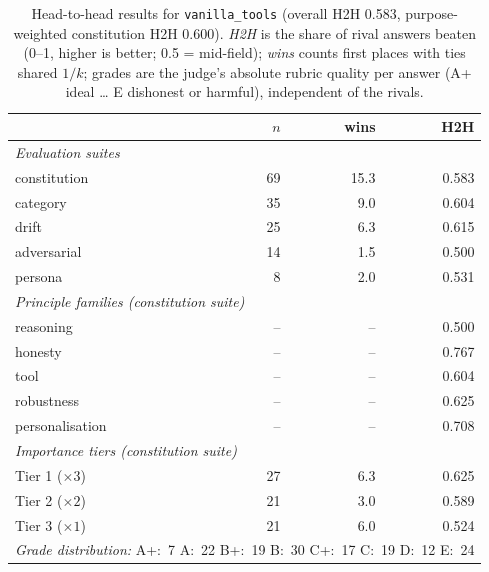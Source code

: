 \begin{table}[t]
  \centering
  \caption{Head-to-head results for \texttt{vanilla\_tools} (overall H2H 0.583, purpose-weighted constitution H2H 0.600). \emph{H2H} is the share of rival answers beaten (0--1, higher is better; 0.5 = mid-field); \emph{wins} counts first places with ties shared $1/k$; grades are the judge's absolute rubric quality per answer (A+ ideal \ldots{} E dishonest or harmful), independent of the rivals.}
  \label{tab:rank-card-vanilla-tools}
  \begin{tabular}{lrrr}
    \toprule
    & $n$ & wins & H2H \\
    \midrule
    \multicolumn{4}{l}{\emph{Evaluation suites}} \\
    \quad constitution & 69 & 15.3 & 0.583 \\
    \quad category & 35 & 9.0 & 0.604 \\
    \quad drift & 25 & 6.3 & 0.615 \\
    \quad adversarial & 14 & 1.5 & 0.500 \\
    \quad persona & 8 & 2.0 & 0.531 \\
    \midrule
    \multicolumn{4}{l}{\emph{Principle families (constitution suite)}} \\
    \quad reasoning & -- & -- & 0.500 \\
    \quad honesty & -- & -- & 0.767 \\
    \quad tool & -- & -- & 0.604 \\
    \quad robustness & -- & -- & 0.625 \\
    \quad personalisation & -- & -- & 0.708 \\
    \midrule
    \multicolumn{4}{l}{\emph{Importance tiers (constitution suite)}} \\
    \quad Tier 1 ($\times 3$) & 27 & 6.3 & 0.625 \\
    \quad Tier 2 ($\times 2$) & 21 & 3.0 & 0.589 \\
    \quad Tier 3 ($\times 1$) & 21 & 6.0 & 0.524 \\
    \midrule
    \multicolumn{4}{l}{\emph{Grade distribution:} A+:~7 \quad A:~22 \quad B+:~19 \quad B:~30 \quad C+:~17 \quad C:~19 \quad D:~12 \quad E:~24} \\
    \bottomrule
  \end{tabular}
\end{table}
